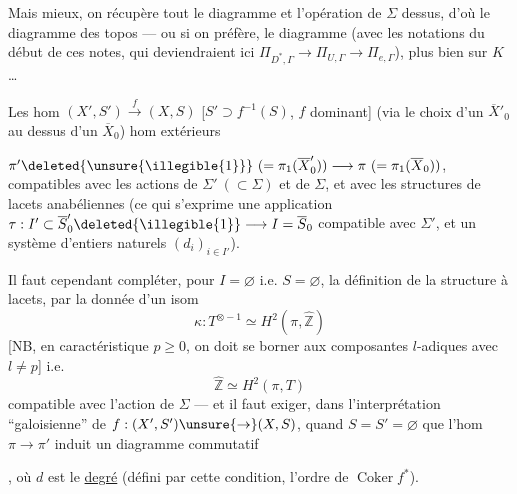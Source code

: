 Mais mieux, on récupère tout le
diagramme
et l'opération de $\Sigma$ dessus, d'où le
diagramme des topos  --- ou si
on préfère, le diagramme
(avec les notations du début de ces notes,
qui deviendraient ici $\Pi_{D^{*},\Gamma}\to\Pi_{U,\Gamma}\to\Pi_{e,\Gamma}$),
plus bien sur $K$\dots

Les hom $(X',S')\xrightarrow{f}(X,S)$
[$S'\supset f^{-1}(S)$, $f$ dominant]  
  (via le choix d'un $\overline X'_0$
au dessus d'un $\overline X_0$)   hom extérieurs


$\pi'\deleted{\unsure{\illegible{1}}}\ (=\pi_1(\overline X'_0))\longrightarrow\pi\ (=\pi_1(\overline X_0))$, compatibles
avec les actions de $\Sigma'\ (\subset\Sigma)$ et de $\Sigma$,
et avec les structures de lacets anabéliennes
(ce qui s'exprime   une application
$\tau:I'\subset\overline S'_0\deleted{\illegible{1}}\longrightarrow I=\overline S_0$ compatible avec
$\Sigma'$, et un système d'entiers naturels
$(d_i)_{i\in I'}$).

Il faut cependant compléter,  pour
$I=\varnothing$ i.e. $S=\varnothing$, la définition de la
structure à lacets, par la donnée d'un
isom
\[
\kappa:T^{\otimes-1}\simeq H^2(\pi,\widehat{\mathbb Z})
\]
[NB, en caractéristique $p\geq0$, on doit se borner
aux composantes $l$-adiques avec $l\ne p$]
i.e.
\[
\widehat{\mathbb Z}\simeq H^2(\pi,T)
\]
compatible avec l'action de $\Sigma$
--- et il faut exiger, dans l'interprétation
``galoisienne'' de $f:(X',S')\unsure{\to}(X,S)$, quand $S=S'=\varnothing$
que l'hom $\pi\to\pi'$ induit un
diagramme commutatif


,
où $d$ est le \uline{degré} (défini  
par cette condition,
   l'ordre de $\operatorname{Coker}f^{*}$). 

